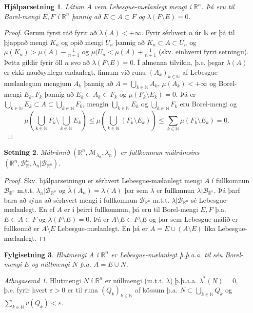 \documentclass[a4paper,icelandic,11pt]{book}
\theoremstyle{plain}      \newtheorem{setn}{Setning}[chapter]
\newtheorem{lemma}[setn]{Hjálparsetning}
\newtheorem{fylgi}[setn]{Fylgisetning}
\theoremstyle{definition} \newtheorem{skilgr}[setn]{Skilgreining}
\theoremstyle{remark}     \newtheorem*{ath}{Athugasemd}
\newcommand{\R}{\mathbb R}
\newcommand{\N}{\mathbb N}
\begin{document}
\begin{lemma}
  Látum $A$ vera Lebesgue-mælanlegt mengi í $\R^{n}$. Þá eru til
  Borel-mengi $E,F$ í $\R^{n}$ þannig að $E\subset A\subset F$ og
  $\lambda(F\setminus E)=0$. 
\end{lemma}
\begin{proof}
  Gerum fyrst ráð fyrir að $\lambda(A)<+\infty$. Fyrir sérhvert $n$ úr
  $\N$ er þá til þjappað mengi $K_{n}$ og opið mengi $U_{n}$ þannig að
  $K_{n}\subset A\subset U_{n}$ og $\mu(K_{n})>\mu(A)-\frac1{n+1}$ og
  $\mu(U_{n}<\mu(A)+\frac1{n+1}$ (skv. einhverri fyrri
  setningu). Þetta gildir fyrir öll $n$ svo að
  $\lambda(F\setminus{E})=0$. Í almenna tilvikin, þ.e. þegar
  $\lambda(A)$ er ekki nauðsynlega endanlegt, finnum við runu
  $(A_{k})_{k\in\N}$ af Lebesgue-mælanlegum mengjum $A_{k}$ þannig að
  $A=\bigcup_{k\in\N}A_{k}$, $\mu(A_{k})<+\infty$ og Borel-mengi
  $E_{k},F_{k}$ þannig að $E_{k}\subset A_{k}\subset F_{k}$ og
  $\mu(F_{k}\setminus{E_{k}})=0$. Þá er
  $\bigcup_{k\in\N}E_{k}\subset{A}\subset\bigcup_{k\in\N}F_{k}$,
  mengin $\bigcup_{k\in\N}E_{k}$ og $\bigcup_{k\in\N}F_{k}$ eru
  Borel-mengi og
  \[
  \mu(\bigcup_{k\in\N}F_{k}\setminus\bigcup_{k\in\N}E_{k})
  \le \mu(\bigcup_{k\in\N}(F_{k}\setminus{E_{k}}))
  \le \sum_{k\in\N}\mu(F_{k}\setminus E_{k})
  = 0.
  \]
\end{proof}
\begin{setn}
  Málrúmið $(\R^{n},\mathcal M_{\lambda_{n}},\lambda_{n})$ er
  fullkomnun málrúmsins
  $(\R^{n},\mathcal{B}_{\R}^{n},\lambda_{n}|\mathcal{B}_{\R^{n}})$. 
\end{setn}
\begin{proof}
  Skv. hjálparsetningu er sérhvert Lebesgue-mælanlegt mengi $A$ í
  fullkomnun $\mathcal B_{\R^{n}}$
  m.t.t. $\lambda_{n}|\mathcal{B}_{\R^{n}}$ og
  $\overline\lambda(A_{n})=\lambda(A)$ þar sem $\overline\lambda$ er
  fullkmnun $\lambda|\mathcal{B}_{\R^{n}}$. Þá þarf bara að sýna að
  sérhvert mengi í fullkomnun $\mathcal{B}_{\R^{n}}$
  m.t.t. $\lambda|\mathcal{B}_{\R^{n}}$ sé Lebesgue-mælanlegt. En ef
  $A$ er í þeirri fullkomnun, þá eru til Borel-mengi $E,F$
  þ.a. $E\subset A\subset F$ og $\lambda(F\setminus E)=0$. Þá er
  $A\setminus E\subset F\setminus E$ og þar sem Lebesgue-málið er
  fullkomið er $A\setminus E$ Lebesgue-mælanlegt. En þá er
  $A=E\cup(A\setminus E)$ líka Lebesgue-mælanlegt.
\end{proof}
\begin{fylgi}
  Hlutmengi $A$ í $\R^{n}$ er Lebesgue-mælanlegt þ.þ.a.a. til séu
  Borel-mengi $E$ og núllmengi $N$ þ.a. $A=E\cup N$. 
\end{fylgi}
\begin{ath}
  Hlutmengi $N$ í $\R^{n}$ er núllmengi (m.t.t. $\lambda$)
  þ.þ.a.a. $\lambda^{*}(N)=0$, þ.e. fyrir hvert $\varepsilon>0$ er til
  runa $(Q_{k})_{k\in\N}$ af kössum
  þ.a. $N\subset\bigcup_{k\in\N}Q_{k}$ og
  $\sum_{k\in\N}v(Q_{k})<\varepsilon$.
\end{ath}
\end{document}
